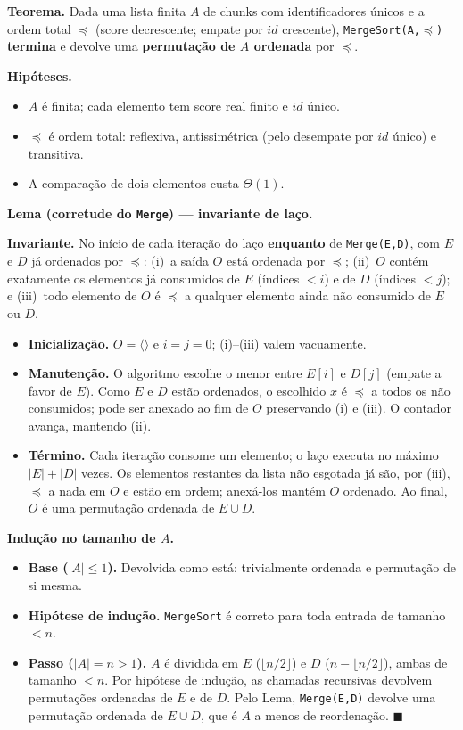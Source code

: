 \documentclass[11pt,a4paper]{article}
\begin{document}
\begin{teo}
\textbf{\color{verde}Teorema.} Dada uma lista finita $A$ de chunks com identificadores únicos e a
ordem total $\preceq$ (score decrescente; empate por $id$ crescente), \texttt{MergeSort(A,$\preceq$)}
\textbf{termina} e devolve uma \textbf{permutação de $A$ ordenada} por $\preceq$.
\end{teo}

\textbf{Hipóteses.}
\begin{itemize}[leftmargin=1.4em,itemsep=1pt]
\item $A$ é finita; cada elemento tem score real finito e $id$ único.
\item $\preceq$ é ordem total: reflexiva, antissimétrica (pelo desempate por $id$ único) e transitiva.
\item A comparação de dois elementos custa $\Theta(1)$.
\end{itemize}

\textbf{Lema (corretude do \texttt{Merge}) --- invariante de laço.}
\begin{inv}
\textbf{Invariante.} No início de cada iteração do laço \textbf{enquanto} de \texttt{Merge(E,D)}, com
$E$ e $D$ já ordenados por $\preceq$: (i)~a saída $O$ está ordenada por $\preceq$; (ii)~$O$ contém
exatamente os elementos já consumidos de $E$ (índices $<i$) e de $D$ (índices $<j$); e (iii)~todo
elemento de $O$ é $\preceq$ a qualquer elemento ainda não consumido de $E$ ou $D$.
\end{inv}
\begin{itemize}[leftmargin=1.4em,itemsep=1pt]
\item \textbf{Inicialização.} $O=\langle\rangle$ e $i=j=0$; (i)--(iii) valem vacuamente.
\item \textbf{Manutenção.} O algoritmo escolhe o menor entre $E[i]$ e $D[j]$ (empate a favor de $E$).
Como $E$ e $D$ estão ordenados, o escolhido $x$ é $\preceq$ a todos os não consumidos; pode ser
anexado ao fim de $O$ preservando (i) e (iii). O contador avança, mantendo (ii).
\item \textbf{Término.} Cada iteração consome um elemento; o laço executa no máximo $|E|+|D|$ vezes.
Os elementos restantes da lista não esgotada já são, por (iii), $\preceq$ a nada em $O$ e estão em
ordem; anexá-los mantém $O$ ordenado. Ao final, $O$ é uma permutação ordenada de $E\cup D$.
\end{itemize}

\textbf{Indução no tamanho de $A$.}
\begin{itemize}[leftmargin=1.4em,itemsep=1pt]
\item \textbf{Base ($|A|\le1$).} Devolvida como está: trivialmente ordenada e permutação de si mesma.
\item \textbf{Hipótese de indução.} \texttt{MergeSort} é correto para toda entrada de tamanho $<n$.
\item \textbf{Passo ($|A|=n>1$).} $A$ é dividida em $E$ ($\lfloor n/2\rfloor$) e $D$
($n-\lfloor n/2\rfloor$), ambas de tamanho $<n$. Por hipótese de indução, as chamadas recursivas
devolvem permutações ordenadas de $E$ e de $D$. Pelo Lema, \texttt{Merge(E,D)} devolve uma permutação
ordenada de $E\cup D$, que é $A$ a menos de reordenação. $\blacksquare$
\end{itemize}
\end{document}

